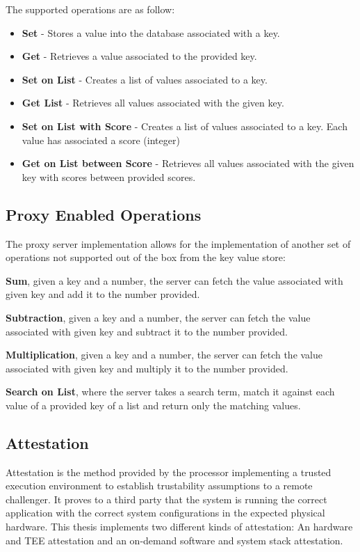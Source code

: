 The supported operations are as follow:

\begin{itemize}
  \item \textbf{Set} - Stores a value into the database associated with a key.
  \item \textbf{Get} - Retrieves a value associated to the provided key.
  \item \textbf{Set on List} - Creates a list of values associated to a key.
  \item \textbf{Get List} - Retrieves all values associated with the given key.
  \item \textbf{Set on List with Score} - Creates a list of values associated to a key. Each value has associated a score (integer)
  \item \textbf{Get on List between Score} - Retrieves all values associated with the given key with scores between provided scores. 
\end{itemize}

\subsection{Proxy Enabled Operations}
\label{ssec:proxy_enabled_operations}

The proxy server implementation allows for the implementation of another set of operations not supported out of the box from the key value store:

\textbf{Sum}, given a key and a number, the server can fetch the value associated with given key and add it to the number provided.

\textbf{Subtraction}, given a key and a number, the server can fetch the value associated with given key and subtract it to the number provided.

\textbf{Multiplication}, given a key and a number, the server can fetch the value associated with given key and multiply it to the number provided.

\textbf{Search on List}, where the server takes a search term, match it against each value of a provided key of a list and return only the matching values.

\subsection{Attestation}
\label{ssec:attestation_system_model}

Attestation is the method provided by the processor implementing a trusted execution environment to establish trustability assumptions to a remote challenger. It proves to a third party that the system is running the correct application with the correct system configurations in the expected physical hardware. This thesis implements two different kinds of attestation: An hardware and \gls{TEE} attestation and an on-demand software and system stack attestation.

